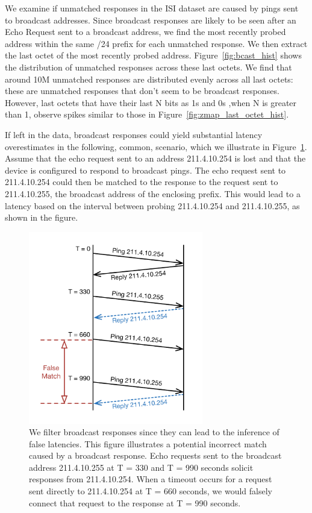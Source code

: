 We examine if unmatched responses in the ISI dataset are caused by pings sent to broadcast addresses.
%
Since broadcast responses are likely to be seen after an
Echo Request sent to a broadcast address, we find
the most recently probed address within the same /24 prefix for each
unmatched response. 
%
We then extract the last octet of the most recently probed
address.
%
Figure~\ref{fig:bcast_hist} shows the
distribution of unmatched responses across these last octets. 
%
We find that around 10M unmatched responses are distributed evenly
across all last octets: these are unmatched responses that don't seem
to be broadcast responses.
%
However, last octets that have their last N bits as 1s and 0s
,when N is greater than 1, observe spikes similar to those in Figure~\ref{fig:zmap_last_octet_hist}.
%
%

If left in the data, broadcast responses could yield
substantial latency overestimates in the following, common,
scenario, which we illustrate in
Figure~\ref{fig:bcast_sample}.
%
Assume that the echo request
sent to an address 211.4.10.254 is lost and that the
device is configured to respond to broadcast pings.  
%
The
echo request sent to 211.4.10.254 could then be matched to
the response to the request sent to 211.4.10.255, the
broadcast address of the enclosing prefix.  
%
This would lead
to a latency based on the interval between probing
211.4.10.254 and 211.4.10.255, as shown in the figure.

\begin{figure}[t]
\begin{center}
\includegraphics[width=3in]{timeouts/figs/wfall_bcast}
\end{center}
\caption{\label{fig:bcast_sample}%
We filter broadcast responses since they can lead to the inference of
false latencies. This figure illustrates a potential incorrect match
caused by a broadcast response.
Echo requests sent to the broadcast address 211.4.10.255 at T = 330
and T = 990 seconds solicit responses from 211.4.10.254.  When a timeout occurs 
for a request sent directly to 211.4.10.254 at T = 660 seconds, we 
would falsely connect that request to the response at T = 990 seconds.}
\end{figure}

